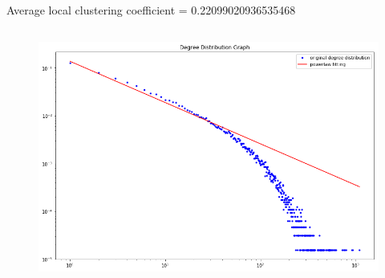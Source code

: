 \documentclass {article}
\begin{document}
\subsection{}
Average local clustering coefficient = 0.22099020936535468

\subsection{}
\subsection{}
\begin{figure}[h]
\includegraphics[width=\textwidth]{img/plot.png}
\end{figure}
\end{document}

